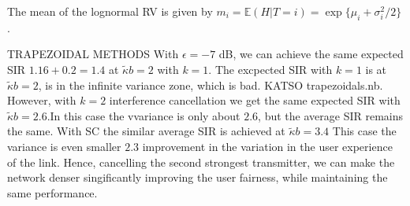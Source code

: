 \documentclass[lettersize,journal]{IEEEtran}
\begin{document}
The mean of the lognormal RV is given by $ m_i=\mathbb{E}(H|T=i) = \exp \{\mu_i+\sigma_i^2/2\}$.

TRAPEZOIDAL METHODS
With $\epsilon = -7$ dB, we can achieve the same expected SIR $1.16+0.2=1.4$ at $\tilde{\kappa} b= 2$ with $k=1$.  The excpected SIR with $k=1$ is at $\tilde{\kappa} b = 2$, is in the infinite variance zone, which is bad. KATSO trapezoidals.nb. However, with $k=2$ interference cancellation we get the same expected SIR with $\tilde{\kappa}b =2.6$.In this case the vvariance is  only about $2.6$, but the average SIR remains the same. With SC the similar average SIR is achieved at $\tilde{\kappa}b = 3.4$ This case the variance is even smaller $2.3$ improvement in the variation in the user experience of the link.  Hence, cancelling the second strongest transmitter, we can make the network denser singificantly improving the user fairness, while maintaining the same performance.

\end{document}
